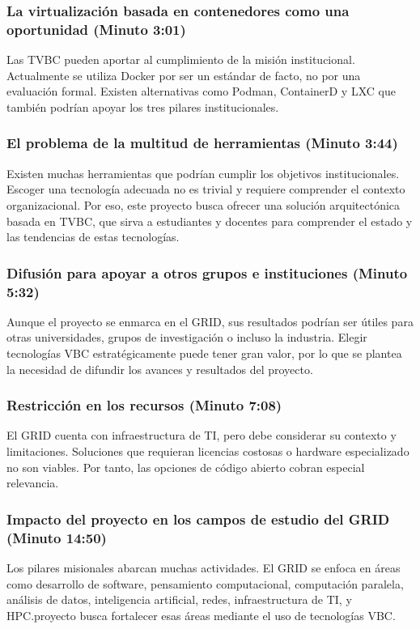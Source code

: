 \subsubsection{La virtualización basada en contenedores como una oportunidad (Minuto 3:01)}
Las TVBC pueden aportar al cumplimiento de la misión institucional. Actualmente se utiliza Docker por ser un estándar de facto, no por una evaluación formal. Existen alternativas como Podman, ContainerD y LXC que también podrían apoyar los tres pilares institucionales.

\subsubsection{El problema de la multitud de herramientas (Minuto 3:44)}
Existen muchas herramientas que podrían cumplir los objetivos institucionales. Escoger una tecnología adecuada no es trivial y requiere comprender el contexto organizacional. Por eso, este proyecto busca ofrecer una solución arquitectónica basada en TVBC, que sirva a estudiantes y docentes para comprender el estado y las tendencias de estas tecnologías.

\subsubsection{Difusión para apoyar a otros grupos e instituciones (Minuto 5:32)}
Aunque el proyecto se enmarca en el GRID, sus resultados podrían ser útiles para otras universidades, grupos de investigación o incluso la industria. Elegir tecnologías VBC estratégicamente puede tener gran valor, por lo que se plantea la necesidad de difundir los avances y resultados del proyecto.

\subsubsection{Restricción en los recursos (Minuto 7:08)}
El GRID cuenta con infraestructura de TI, pero debe considerar su contexto y limitaciones. Soluciones que requieran licencias costosas o hardware especializado no son viables. Por tanto, las opciones de código abierto cobran especial relevancia.

\subsubsection{Impacto del proyecto en los campos de estudio del GRID (Minuto 14:50)}
Los pilares misionales abarcan muchas actividades. El GRID se enfoca en áreas como desarrollo de software, pensamiento computacional, computación paralela, análisis de datos, inteligencia artificial, redes, infraestructura de TI, y HPC.\@Este proyecto busca fortalecer esas áreas mediante el uso de tecnologías VBC.\@

